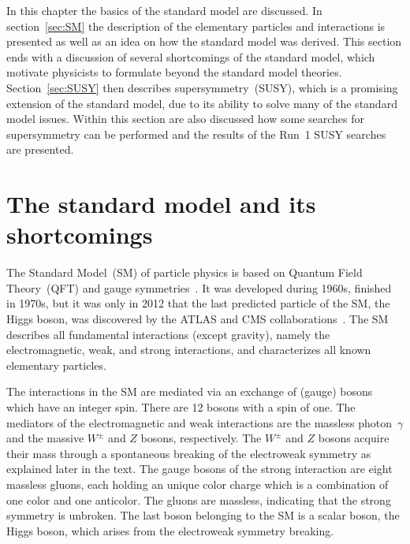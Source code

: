\clearpage

\setcounter{secnumdepth}{4}
\setcounter{secnumdepth}{4}

In this chapter the basics of the standard model are discussed. In section~\ref{sec:SM} the description of the elementary particles and interactions is presented as well as an idea on how the standard model was derived. This section ends with a discussion of several shortcomings of the standard model, which motivate physicists to formulate beyond the standard model theories. Section~\ref{sec:SUSY} then describes supersymmetry~(SUSY), which is a promising extension of the standard model, due to its ability to solve many of the standard model issues. Within this section are also discussed how some searches for supersymmetry can be performed and  the results of the Run~1 SUSY searches are presented. 

\section{The standard model and its shortcomings~\label{sec:SM}}

The Standard Model~(SM) of particle physics is based on Quantum Field Theory~(QFT) and gauge symmetries~\cite{9783527406012}. It was developed during 1960s, finished in 1970s, but it was only in 2012 that the last predicted particle of the SM, the Higgs boson, was discovered by the ATLAS and CMS collaborations~\cite{Chatrchyan:2012xdj, Aad:2012tfa}. The SM describes all fundamental interactions (except gravity), namely the electromagnetic, weak, and strong interactions, and characterizes all known elementary particles. 


The interactions in the SM are mediated via an exchange of (gauge) bosons which have an integer spin. There are 12 bosons with a spin of one. The mediators of the electromagnetic and weak interactions are the massless photon~$\gamma$ and the massive $W^{\pm}$ and $Z$ bosons, respectively. The $W^{\pm}$ and $Z$ bosons acquire their mass through a spontaneous breaking of the electroweak symmetry as explained later in the text. The gauge bosons of the strong interaction are eight massless gluons, each holding an unique color charge which is a combination of one color and one anticolor. The gluons are massless, indicating that the strong symmetry is unbroken. The last boson belonging to the SM is a scalar boson, the Higgs boson, which arises from the electroweak symmetry breaking. 

